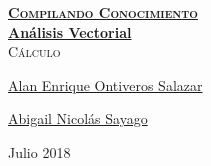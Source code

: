 \documentclass[12pt, fleqn]{report}                             %
\author{Oscar Andrés Rosas}                                     %
\theoremstyle{break}                                            %
\begin{document}
\begin{titlepage}
    
    \pagecolor{TitlePageColor}                                      %
    \color{white}                                                   %
    \newcommand{\Github}{https://github.com/compilandoconocimiento} %

    \vspace                                                         %
    \baselineskip                                                   %

    \makebox[0pt][l]{\rule{1.3\textwidth}{3pt}}                     %
    
    \href{\Github}                                                  %
    {\textbf{\textsc{\Huge Compilando Conocimiento}}}\\[2.7cm]      %

    \href{\Github/LibroAnalisisVectorial}                           %
    {\fontsize{55}{66}\selectfont                                   %
        \textbf{Análisis Vectorial}}\\[0.5cm]                       %
    \textcolor{ColorSubtext}{\textsc{\Huge Cálculo}}                %
    
    \vfill                                                          %
    
    \href{https://github.com/alaneos777}                            %
    {\LARGE \textsf{Alan Enrique Ontiveros Salazar}}                %

    \href{https://github.com/abiisnn}                               %
    {\LARGE \textsf{Abigail Nicolás Sayago }}                       %

    \vspace                                                         %
    \baselineskip                                                   %
    
    {\large \textsf{Julio 2018}}                                    %

\end{titlepage}
\end{document}
